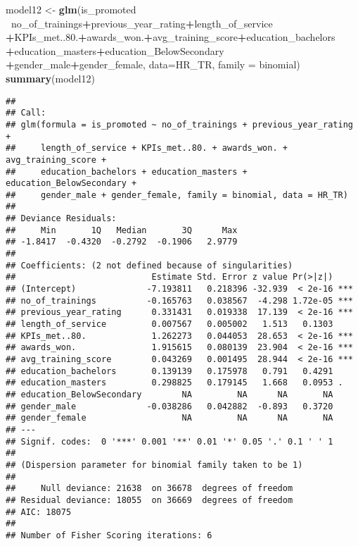 \documentclass[
]{article}
\newenvironment{Shaded}{\begin{snugshade}}{\end{snugshade}}
\newcommand{\DataTypeTok}[1]{\textcolor[rgb]{0.13,0.29,0.53}{#1}}
\newcommand{\FloatTok}[1]{\textcolor[rgb]{0.00,0.00,0.81}{#1}}
\newcommand{\KeywordTok}[1]{\textcolor[rgb]{0.13,0.29,0.53}{\textbf{#1}}}
\newcommand{\NormalTok}[1]{#1}
\newcommand{\OperatorTok}[1]{\textcolor[rgb]{0.81,0.36,0.00}{\textbf{#1}}}
\newcommand{\StringTok}[1]{\textcolor[rgb]{0.31,0.60,0.02}{#1}}
\begin{document}
\begin{Shaded}
\begin{Highlighting}[]
\NormalTok{model12 <-}\StringTok{ }\KeywordTok{glm}\NormalTok{(is_promoted }\OperatorTok{~}\NormalTok{no_of_trainings}\OperatorTok{+}\NormalTok{previous_year_rating}\OperatorTok{+}\NormalTok{length_of_service}
               \OperatorTok{+}\NormalTok{KPIs_met..}\FloatTok{80.}\OperatorTok{+}\NormalTok{awards_won.}\OperatorTok{+}\NormalTok{avg_training_score}\OperatorTok{+}\NormalTok{education_bachelors}
               \OperatorTok{+}\NormalTok{education_masters}\OperatorTok{+}\NormalTok{education_BelowSecondary}
               \OperatorTok{+}\NormalTok{gender_male}\OperatorTok{+}\NormalTok{gender_female, }
               \DataTypeTok{data=}\NormalTok{HR_TR, }\DataTypeTok{family =}\NormalTok{ binomial)}
\KeywordTok{summary}\NormalTok{(model12)}
\end{Highlighting}
\end{Shaded}

\begin{verbatim}
## 
## Call:
## glm(formula = is_promoted ~ no_of_trainings + previous_year_rating + 
##     length_of_service + KPIs_met..80. + awards_won. + avg_training_score + 
##     education_bachelors + education_masters + education_BelowSecondary + 
##     gender_male + gender_female, family = binomial, data = HR_TR)
## 
## Deviance Residuals: 
##     Min       1Q   Median       3Q      Max  
## -1.8417  -0.4320  -0.2792  -0.1906   2.9779  
## 
## Coefficients: (2 not defined because of singularities)
##                           Estimate Std. Error z value Pr(>|z|)    
## (Intercept)              -7.193811   0.218396 -32.939  < 2e-16 ***
## no_of_trainings          -0.165763   0.038567  -4.298 1.72e-05 ***
## previous_year_rating      0.331431   0.019338  17.139  < 2e-16 ***
## length_of_service         0.007567   0.005002   1.513   0.1303    
## KPIs_met..80.             1.262273   0.044053  28.653  < 2e-16 ***
## awards_won.               1.915615   0.080139  23.904  < 2e-16 ***
## avg_training_score        0.043269   0.001495  28.944  < 2e-16 ***
## education_bachelors       0.139139   0.175978   0.791   0.4291    
## education_masters         0.298825   0.179145   1.668   0.0953 .  
## education_BelowSecondary        NA         NA      NA       NA    
## gender_male              -0.038286   0.042882  -0.893   0.3720    
## gender_female                   NA         NA      NA       NA    
## ---
## Signif. codes:  0 '***' 0.001 '**' 0.01 '*' 0.05 '.' 0.1 ' ' 1
## 
## (Dispersion parameter for binomial family taken to be 1)
## 
##     Null deviance: 21638  on 36678  degrees of freedom
## Residual deviance: 18055  on 36669  degrees of freedom
## AIC: 18075
## 
## Number of Fisher Scoring iterations: 6
\end{verbatim}
\end{document}
